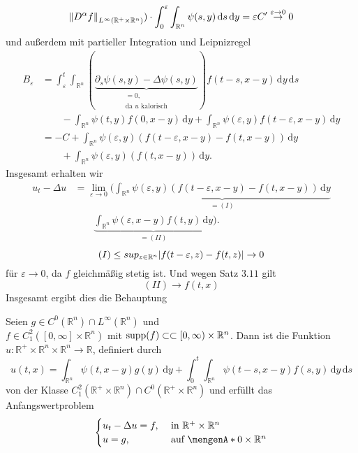 \begin{beweis}
\[{{		 \norm{D^{\alpha}f}_{L^{\infty}(\mathbb{R}^{+} \times \mathbb{R}^n)}}}) \cdot \int_{0}^{\varepsilon} \int_{\mathbb{R}^n}^{} 
		 \psi(s,y) \,\mathrm{d}s \,\mathrm{d}y = \varepsilon C' \stackrel{\varepsilon \to 0}{\to } 0
	\]
	und außerdem mit partieller Integration und Leipnizregel
	\begin{align*}
			B _{\varepsilon} &= \int_{\varepsilon}^{t} \int_{\mathbb{R}^n}^{}
		 (\underset{\substack{=0, \\ \text{da $u$ kalorisch}}}{\underbrace{ \partial_s \psi(s,y) - \Delta \psi(s,y)}})
		 f(t-s,x-y) \,\mathrm{d}y \,\mathrm{d}s \\ & \qquad - \int_{\mathbb{R}^n}^{} \psi(t,y) f(0,x-y) \,\mathrm{d}y 
		 + \int_{\mathbb{R}^n}^{} \psi(\varepsilon,y)f(t-\varepsilon,x-y) \,\mathrm{d}y \\
		 &= -C + \int_{\mathbb{R}^n}^{} \psi(\varepsilon,y)(f(t-\varepsilon,x-y)-f(t,x-y)) \,\mathrm{d}y \\
		 & \qquad + \int_{\mathbb{R}^n}^{} \psi(\varepsilon,y)(f(t,x-y)) \,\mathrm{d}y.
	\end{align*}
	Insgesamt erhalten wir
	\begin{align*}
		u_t - \Delta u &= \lim_{\varepsilon \to 0} ( \underset{=(I)}{\underbrace{\int_{\mathbb{R}^n}^{} \psi(\varepsilon,y)(f(t-\varepsilon,x-y)-f(t,x-y)) 
		\,\mathrm{d}y}} \\ & \qquad \underset{=(II)}{\underbrace{\int_{\mathbb{R}^n}^{} \psi(\varepsilon,x-y) f(t,y) \,\mathrm{d}y}} ).
	\end{align*}
	\[
		(I) \leq sup_{z \in \mathbb{R}^n} \lvert f(t-\varepsilon,z)-f(t,z)\rvert \to 0
	\]
	für $\varepsilon \to 0$, da $f$ gleichmäßig stetig ist. Und wegen Satz $3.11$ gilt
	\[
		(II) \to f(t,x)
	\]
	Insgesamt ergibt dies die Behauptung
\end{beweis}
\begin{satz}
	Seien $g \in C^0(\mathbb{R}^n) \cap L^{\infty}(\mathbb{R}^n)$ und \\ $f \in C_1^2([0,\infty]\times \mathbb{R}^n)$ mit $\operatorname{supp}(f) \subset \subset [0,\infty) \times \mathbb{R}^n$. Dann ist die Funktion $u: \mathbb{R}^{+} \times \mathbb{R}^n \times \mathbb{R}^n \to \mathbb{R}$, definiert durch
	\[
		u(t,x)= \int_{\mathbb{R}^n}^{} \psi(t,x-y)g(y) \,\mathrm{d}y + \int_{0}^{t}\int_{\mathbb{R}^n}^{} \psi(t-s,x-y)f(s,y) \,\mathrm{d}y \,\mathrm{d}s
	\]
	von der Klasse $C_1^2(\mathbb{R}^{+} \times \mathbb{R}^n) \cap C^0(\mathbb{R}^{+} \times \mathbb{R}^n)$ und erfüllt das Anfangswertproblem
	\[
		\begin{cases}
			u_t- \Delta u =f, &\text{ in }\mathbb{R}^{+} \times \mathbb{R}^n\\
			u = g, &\text{ auf } \set{0} \times \mathbb{R}^n
		\end{cases}
	\]
\end{satz}

